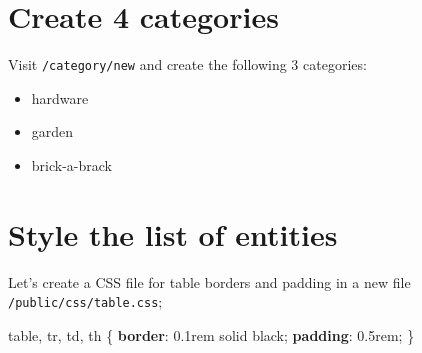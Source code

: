 \documentclass[a4paperpaper,openright]{book}
\newenvironment{Shaded}{}{}
\newcommand{\ConstantTok}[1]{\textcolor[rgb]{0.53,0.00,0.00}{#1}}
\newcommand{\DataTypeTok}[1]{\textcolor[rgb]{0.56,0.13,0.00}{#1}}
\newcommand{\DecValTok}[1]{\textcolor[rgb]{0.25,0.63,0.44}{#1}}
\newcommand{\KeywordTok}[1]{\textcolor[rgb]{0.00,0.44,0.13}{\textbf{#1}}}
\newcommand{\NormalTok}[1]{#1}
\newcommand{\OperatorTok}[1]{\textcolor[rgb]{0.40,0.40,0.40}{#1}}
\newcommand{\OtherTok}[1]{\textcolor[rgb]{0.00,0.44,0.13}{#1}}
\newcommand{\StringTok}[1]{\textcolor[rgb]{0.25,0.44,0.63}{#1}}
\providecommand{\tightlist}{%
  \setlength{\itemsep}{0pt}\setlength{\parskip}{0pt}}
\begin{document}
\begin{Shaded}
\end{Shaded}

\hypertarget{create-4-categories}{%
\section{Create 4 categories}\label{create-4-categories}}

Visit \texttt{/category/new} and create the following 3 categories:

\begin{itemize}
\tightlist
\item
  hardware
\item
  garden
\item
  brick-a-brack
\end{itemize}

\hypertarget{style-the-list-of-entities}{%
\section{Style the list of entities}\label{style-the-list-of-entities}}

Let's create a CSS file for table borders and padding in a new file
\texttt{/public/css/table.css};

\begin{Shaded}
\begin{Highlighting}[]
\NormalTok{    table}\OperatorTok{,}\NormalTok{ tr}\OperatorTok{,}\NormalTok{ td}\OperatorTok{,}\NormalTok{ th \{}
        \KeywordTok{border}\NormalTok{: }\DecValTok{0.1}\DataTypeTok{rem} \DecValTok{solid} \ConstantTok{black}\OperatorTok{;}
        \KeywordTok{padding}\NormalTok{: }\DecValTok{0.5}\DataTypeTok{rem}\OperatorTok{;}
\NormalTok{    \}}
\end{Highlighting}
\end{Shaded}
\end{document}
